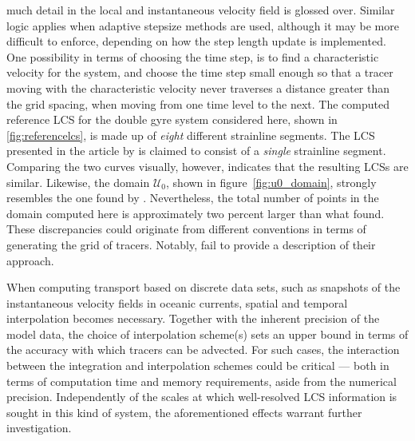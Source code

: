 much detail in the local and instantaneous velocity field is glossed over.
Similar logic applies when adaptive stepsize methods are used, although it
may be more difficult to enforce, depending on how the step length
update is implemented. One possibility in terms of choosing the time step, is to
find a characteristic velocity for the system, and choose the time step small
enough so that a tracer moving with the characteristic velocity never traverses
a distance greater than the grid spacing, when moving from one time level to
the next.
\clearpage
The computed reference LCS for the double gyre system considered here, shown in
\cref{fig:referencelcs}, is made up of \emph{eight} different strainline
segments. The LCS presented in the article by \textcite{farazmand2012computing}
is claimed to consist of a \emph{single} strainline segment. Comparing the two
curves visually, however, indicates that the resulting LCSs are similar.
Likewise, the domain $\mathcal{U}_{0}$, shown in figure~\ref{fig:u0_domain},
strongly resembles the one found by \citeauthor{farazmand2012computing}.
Nevertheless, the total number of points in the domain computed here is
approximately two percent larger than what \citeauthor{farazmand2012computing}
found. These discrepancies could originate from different conventions in terms
of generating the grid of tracers. Notably, \citeauthor{farazmand2012computing}
fail to provide a description of their approach.

When computing transport based on discrete data sets, such as snapshots of the
instantaneous velocity fields in oceanic currents, spatial and temporal
interpolation becomes necessary. Together with the inherent precision of the
model data, the choice of interpolation scheme(s) sets an upper bound
in terms of the accuracy with which tracers can be advected. For such cases,
the interaction between the integration and interpolation schemes could
be critical --- both in terms of computation time and memory requirements,
aside from the numerical precision. Independently of the scales at which
well-resolved LCS information is sought in this kind of system, the
aforementioned effects warrant further investigation.
